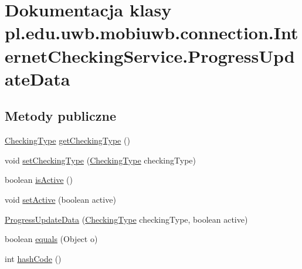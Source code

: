 \hypertarget{classpl_1_1edu_1_1uwb_1_1mobiuwb_1_1connection_1_1_internet_checking_service_1_1_progress_update_data}{}\section{Dokumentacja klasy pl.\+edu.\+uwb.\+mobiuwb.\+connection.\+Internet\+Checking\+Service.\+Progress\+Update\+Data}
\label{classpl_1_1edu_1_1uwb_1_1mobiuwb_1_1connection_1_1_internet_checking_service_1_1_progress_update_data}
\subsection*{Metody publiczne}
\begin{DoxyCompactItemize}
\item 
\hyperlink{enumpl_1_1edu_1_1uwb_1_1mobiuwb_1_1connection_1_1_checking_type}{Checking\+Type} \hyperlink{classpl_1_1edu_1_1uwb_1_1mobiuwb_1_1connection_1_1_internet_checking_service_1_1_progress_update_data_adb6d505b72d20e32998036d00900e73d}{get\+Checking\+Type} ()
\item 
void \hyperlink{classpl_1_1edu_1_1uwb_1_1mobiuwb_1_1connection_1_1_internet_checking_service_1_1_progress_update_data_a103ec13bab3832d142bb411fce59536f}{set\+Checking\+Type} (\hyperlink{enumpl_1_1edu_1_1uwb_1_1mobiuwb_1_1connection_1_1_checking_type}{Checking\+Type} checking\+Type)
\item 
boolean \hyperlink{classpl_1_1edu_1_1uwb_1_1mobiuwb_1_1connection_1_1_internet_checking_service_1_1_progress_update_data_a1e43aaa0488425febfd9d58d5e43adc3}{is\+Active} ()
\item 
void \hyperlink{classpl_1_1edu_1_1uwb_1_1mobiuwb_1_1connection_1_1_internet_checking_service_1_1_progress_update_data_ad7234afa4d180699f0807787e05be4f1}{set\+Active} (boolean active)
\item 
\hyperlink{classpl_1_1edu_1_1uwb_1_1mobiuwb_1_1connection_1_1_internet_checking_service_1_1_progress_update_data_a4598bd8514477f8da76f81986a8636cc}{Progress\+Update\+Data} (\hyperlink{enumpl_1_1edu_1_1uwb_1_1mobiuwb_1_1connection_1_1_checking_type}{Checking\+Type} checking\+Type, boolean active)
\item 
boolean \hyperlink{classpl_1_1edu_1_1uwb_1_1mobiuwb_1_1connection_1_1_internet_checking_service_1_1_progress_update_data_afeee953292d0f69eb967d500e537a791}{equals} (Object o)
\item 
int \hyperlink{classpl_1_1edu_1_1uwb_1_1mobiuwb_1_1connection_1_1_internet_checking_service_1_1_progress_update_data_aa2504f7bbb2b3e9287d5e74b669958fb}{hash\+Code} ()
\end{DoxyCompactItemize}



